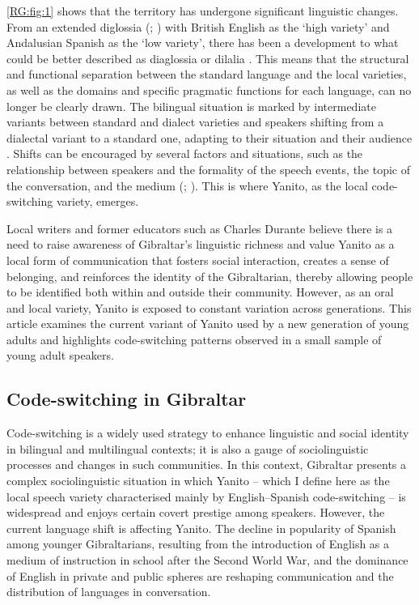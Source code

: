 \documentclass[output=paper]{langscibook}
\begin{document}
\autoref{RG:fig:1} shows that the territory has undergone significant linguistic changes. From an extended diglossia
(\citealt{fishman_bilingualism_1967}; \citealt{auer_postscript_2005})  with British English as the ‘high variety’ and Andalusian Spanish as the ‘low variety’, there has been a development to what could be better described as diaglossia \citep{auer_postscript_2005} or dilalia \citep{berruto_hinskens_dialectstandard_2005}. This means that the structural and functional separation between the standard language and the local varieties, as well as the domains and specific pragmatic functions for each language, can no longer be clearly drawn. The bilingual situation is marked by intermediate variants between standard and dialect varieties and speakers shifting from a dialectal variant to a standard one, adapting to their situation and their audience \citep{rodriguez_garcia_role_2021}. Shifts can be encouraged by several factors and situations, such as the relationship between speakers and the formality of the speech events, the topic of the conversation, and the medium (\citealt{auer_postscript_2005}; \citeyear{auer_language_2014}). This is where Yanito, as the local code-switching variety, emerges. 

Local writers and former educators such as Charles Durante believe there is a need to raise awareness of Gibraltar’s linguistic richness \citep{durante_charles_2019} and value Yanito as a local form of communication that fosters social interaction, creates a sense of belonging, and reinforces the identity of the Gibraltarian, thereby allowing people to be identified both within and outside their community. However, as an oral and local variety, Yanito is exposed to constant variation across generations. This article examines the current variant of Yanito used by a new generation of young adults and highlights code-switching patterns observed in a small sample of young adult speakers.

\subsection{	Code-switching in Gibraltar }
\label{RG:sec:02_2}

Code-switching is a widely used strategy to enhance linguistic and social identity in bilingual and multilingual contexts; it is also a gauge of sociolinguistic processes and changes in such communities. In this context, Gibraltar presents a complex sociolinguistic situation in which Yanito – which I define here as the local speech variety characterised mainly by English–Spanish code-switching – is widespread and enjoys certain covert prestige among speakers. However, the current language shift is affecting Yanito. The decline in popularity of Spanish among younger Gibraltarians, resulting from the introduction of English as a medium of instruction in school after the Second World War, and the dominance of English in private and public spheres are reshaping communication and the distribution of languages in conversation. 
\end{document}

